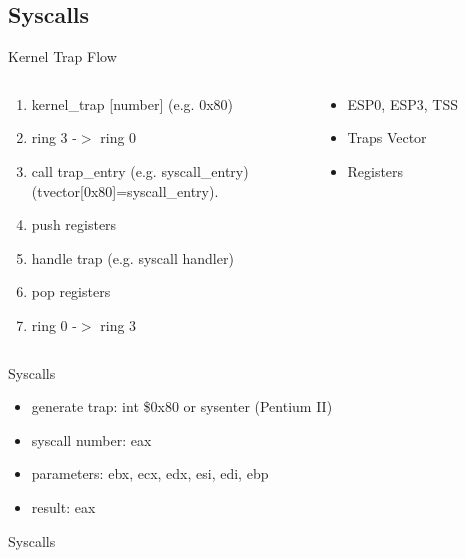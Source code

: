 \documentclass{workshop}
\begin{document}
\subsection{Syscalls}

\begin{frame}{Kernel Trap Flow}
  \begin{columns}
    \begin{column}[l]{0.55\textwidth}
        \begin{enumerate}
                \item<5-> kernel\_trap [number] (e.g. 0x80)
                \item<5-> ring 3 -$>$ ring 0
                \item<5-> call trap\_entry (e.g. syscall\_entry)\\
                (tvector[0x80]=syscall\_entry).
                \item<5-> push registers
                \item<5-> handle trap (e.g. syscall handler)
                \item<5-> pop registers
                \item<5-> ring 0 -$>$ ring 3
        \end{enumerate}
    \end{column}
    \begin{column}[l]{0.35\textwidth}
        \begin{itemize}
                \item<2-> ESP0, ESP3, TSS
                \item<3-> Traps Vector 
                \item<4-> Registers
        \end{itemize}
    \end{column}
  \end{columns}
\end{frame}

\begin{frame}{Syscalls}
\begin{itemize}
\item generate trap: int \$0x80 or sysenter (Pentium II)
\item syscall number: eax
\item parameters: ebx, ecx, edx, esi, edi, ebp
\item result: eax
\end{itemize}
\end{frame}

\begin{frame}{Syscalls}

\end{frame}
\end{document}
